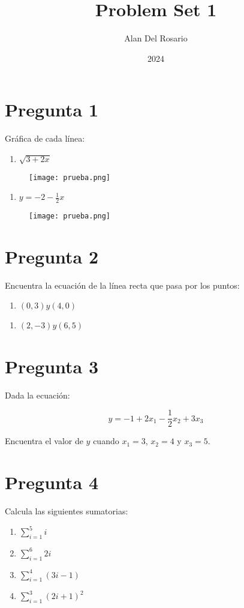 \documentclass[]{article}
\title{Problem Set 1}
\author{Alan Del Rosario}
\date{2024}
\begin{document}
\section*{Pregunta 1}

Gráfica de cada línea:

\begin{enumerate}[label=\alph*)]
	\item $\sqrt{3+2x}$ 
\end{enumerate}

\begin{figure}[H]
	\texttt{[image: prueba.png]}
\end{figure}

\begin{enumerate}[label=\alph*)]
	\item $y=-2-\frac{1}{2}x$
\end{enumerate}

\begin{figure}[H]
	\texttt{[image: prueba.png]}
\end{figure}	
	
\section*{Pregunta 2}
Encuentra la ecuación de la línea recta que pasa por los puntos:

\begin{enumerate} [label=\alph*)]
	\item $(0,3) y (4,0)$
\end{enumerate}



\begin{enumerate} [label=\alph*)]
	\item $(2,-3) y (6,5)$
\end{enumerate}
 
\section*{Pregunta 3}
Dada la ecuación: 

$$y=-1+2x_1-\frac{1}{2}x_2+3x_3$$

Encuentra el valor de $y$ cuando $x_1=3$, $x_2=4$ y $x_3=5$.

\section*{Pregunta 4}
Calcula las siguientes sumatorias:

\begin{enumerate}[label=(\alph*)]
	\item $\sum_{i=1}^{5}i$
	\item $\sum_{i=1}^{6}2i$
	\item $\sum_{i=1}^{4}(3i-1)$	
	\item $\sum_{i=1}^{3}(2i+1)^2$	
\end{enumerate}
\end{document}
